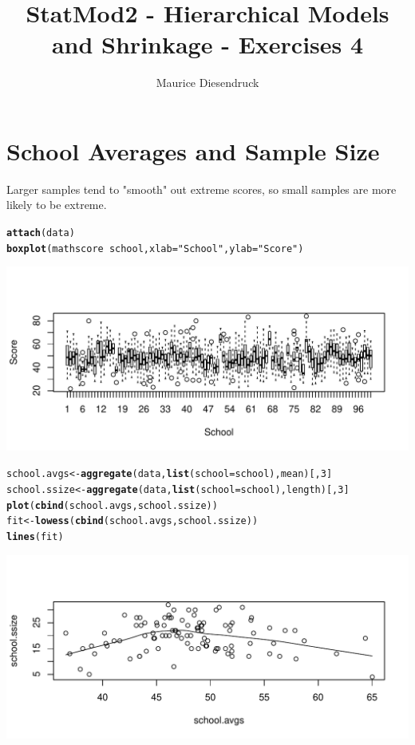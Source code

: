 \documentclass[12pt,letterpaper]{article}\usepackage[]{graphicx}\usepackage[]{color}
\author{Maurice Diesendruck\vspace{-2ex}}
\title{StatMod2 - Hierarchical Models and Shrinkage - Exercises 4\vspace{-1ex}}
\makeatletter
\def\maxwidth{ %
  \ifdim\Gin@nat@width>\linewidth
    \linewidth
  \else
    \Gin@nat@width
  \fi
}
\newcommand{\hlnum}[1]{\textcolor[rgb]{0.686,0.059,0.569}{#1}}%
\newcommand{\hlstr}[1]{\textcolor[rgb]{0.192,0.494,0.8}{#1}}%
\newcommand{\hlopt}[1]{\textcolor[rgb]{0,0,0}{#1}}%
\newcommand{\hlstd}[1]{\textcolor[rgb]{0.345,0.345,0.345}{#1}}%
\newcommand{\hlkwb}[1]{\textcolor[rgb]{0.69,0.353,0.396}{#1}}%
\newcommand{\hlkwc}[1]{\textcolor[rgb]{0.333,0.667,0.333}{#1}}%
\newcommand{\hlkwd}[1]{\textcolor[rgb]{0.737,0.353,0.396}{\textbf{#1}}}%
\newenvironment{kframe}{%
 \def\at@end@of@kframe{}%
 \ifinner\ifhmode%
  \def\at@end@of@kframe{\end{minipage}}%
  \begin{minipage}{\columnwidth}%
 \fi\fi%
 \def\FrameCommand##1{\hskip\@totalleftmargin \hskip-\fboxsep
 \colorbox{shadecolor}{##1}\hskip-\fboxsep
     \hskip-\linewidth \hskip-\@totalleftmargin \hskip\columnwidth}%
 \MakeFramed {\advance\hsize-\width
   \@totalleftmargin\z@ \linewidth\hsize
   \@setminipage}}%
 {\par\unskip\endMakeFramed%
 \at@end@of@kframe}
\newenvironment{knitrout}{}{} %
\makeatother
\begin{document}
\maketitle

\section{School Averages and Sample Size}

Larger samples tend to "smooth" out extreme scores, so small samples are more 
likely to be extreme.\\

\begin{knitrout}
\color{fgcolor}\begin{kframe}
\begin{alltt}
\hlkwd{attach}\hlstd{(data)}
\hlkwd{boxplot}\hlstd{(mathscore} \hlopt{~} \hlstd{school,} \hlkwc{xlab}\hlstd{=}\hlstr{"School"}\hlstd{,} \hlkwc{ylab}\hlstd{=}\hlstr{"Score"}\hlstd{)}
\end{alltt}
\end{kframe}
\includegraphics[width=\maxwidth]{figure/unnamed-chunk-1-1} 
\begin{kframe}\begin{alltt}
\hlstd{school.avgs} \hlkwb{<-} \hlkwd{aggregate}\hlstd{(data,} \hlkwd{list}\hlstd{(}\hlkwc{school}\hlstd{=school), mean)[,}\hlnum{3}\hlstd{]}
\hlstd{school.ssize} \hlkwb{<-} \hlkwd{aggregate}\hlstd{(data,} \hlkwd{list}\hlstd{(}\hlkwc{school}\hlstd{=school), length)[,}\hlnum{3}\hlstd{]}
\hlkwd{plot}\hlstd{(}\hlkwd{cbind}\hlstd{(school.avgs, school.ssize))}
\hlstd{fit} \hlkwb{<-} \hlkwd{lowess}\hlstd{(}\hlkwd{cbind}\hlstd{(school.avgs, school.ssize))}
\hlkwd{lines}\hlstd{(fit)}
\end{alltt}
\end{kframe}
\includegraphics[width=\maxwidth]{figure/unnamed-chunk-1-2} 

\end{knitrout}
\end{document}

